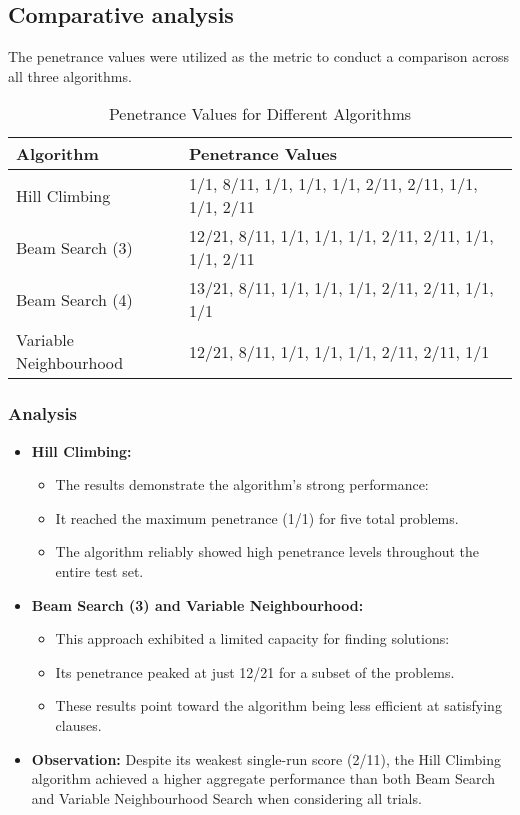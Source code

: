 \documentclass[conference]{IEEEtran}
\begin{document}
\subsection{Comparative analysis}
The penetrance values were utilized as the metric to conduct a comparison across all three algorithms.

 
\begin{table}[h]
\centering
\begin{tabular}{|p{3cm}|p{3cm}|}
\hline
\textbf{Algorithm} & \textbf{Penetrance Values} \\
\hline
Hill Climbing & 1/1, 8/11, 1/1, 1/1, 1/1, 2/11, 2/11, 1/1, 1/1, 2/11 \\
\hline
Beam Search (3) & 12/21, 8/11, 1/1, 1/1, 1/1, 2/11, 2/11, 1/1, 1/1, 2/11 \\
\hline
Beam Search (4) & 13/21, 8/11, 1/1, 1/1, 1/1, 2/11, 2/11, 1/1, 1/1 \\
\hline
Variable Neighbourhood & 12/21, 8/11, 1/1, 1/1, 1/1, 2/11, 2/11, 1/1 \\
\hline
\end{tabular}

\caption{Penetrance Values for Different Algorithms}
\label{tab:penetrance_values}
\end{table}
\subsubsection{Analysis}
\begin{itemize}
  \item \textbf{Hill Climbing:}
  \begin{itemize}
    \item The results demonstrate the algorithm's strong performance:


    \item It reached the maximum penetrance (1/1) for five total problems.


    \item The algorithm reliably showed high penetrance levels throughout the entire test set.
  \end{itemize}
  
  \item \textbf{Beam Search (3) and Variable Neighbourhood:}
  \begin{itemize}
    \item This approach exhibited a limited capacity for finding solutions:


    \item Its penetrance peaked at just 12/21 for a subset of the problems.


    \item These results point toward the algorithm being less efficient at satisfying clauses.


  \end{itemize}
  
  \item \textbf{Observation:} Despite its weakest single-run score (2/11), the Hill Climbing algorithm achieved a higher aggregate performance than both Beam Search and Variable Neighbourhood Search when considering all trials.
\end{itemize}
\end{document}
